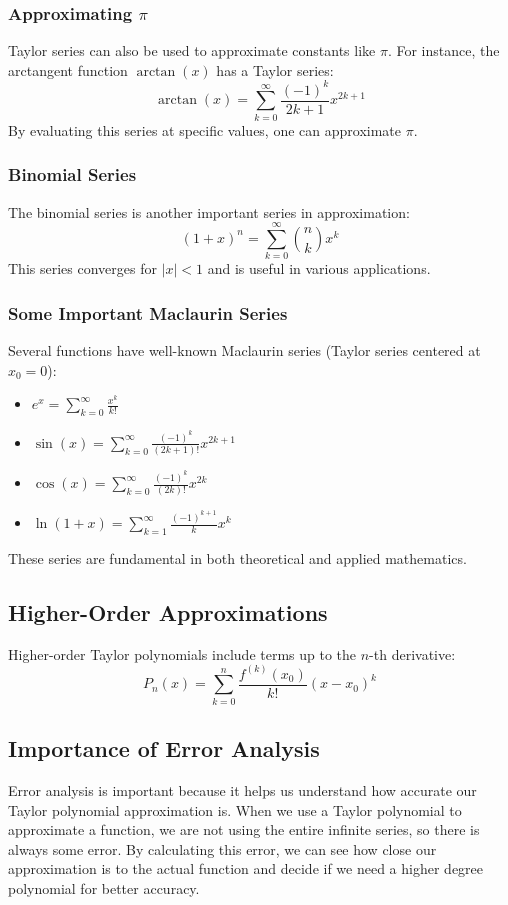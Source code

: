 \documentclass{article}
\begin{document}
\subsubsection*{Approximating \( \pi \)}
Taylor series can also be used to approximate constants like \( \pi \). For instance, the arctangent function \( \arctan(x) \) has a Taylor series:
\[ \arctan(x) = \sum_{k=0}^{\infty} \frac{(-1)^k}{2k+1} x^{2k+1} \]
By evaluating this series at specific values, one can approximate \( \pi \).

\subsubsection*{Binomial Series}
The binomial series is another important series in approximation:
\[ (1 + x)^n = \sum_{k=0}^{\infty} \binom{n}{k} x^k \]
This series converges for \( |x| < 1 \) and is useful in various applications.

\subsubsection*{Some Important Maclaurin Series}
Several functions have well-known Maclaurin series (Taylor series centered at \( x_0 = 0 \)):
\begin{itemize}
    \item \( e^x = \sum_{k=0}^{\infty} \frac{x^k}{k!} \)
    \item \( \sin(x) = \sum_{k=0}^{\infty} \frac{(-1)^k}{(2k+1)!} x^{2k+1} \)
    \item \( \cos(x) = \sum_{k=0}^{\infty} \frac{(-1)^k}{(2k)!} x^{2k} \)
    \item \( \ln(1+x) = \sum_{k=1}^{\infty} \frac{(-1)^{k+1}}{k} x^k \)
\end{itemize}
These series are fundamental in both theoretical and applied mathematics.
\subsection*{Higher-Order Approximations}
Higher-order Taylor polynomials include terms up to the \( n \)-th derivative:
\[ P_n(x) = \sum_{k=0}^{n} \frac{f^{(k)}(x_0)}{k!} (x - x_0)^k \]
\subsection*{Importance of Error Analysis}
Error analysis is important because it helps us understand how accurate our Taylor polynomial approximation is. When we use a Taylor polynomial to approximate a function, we are not using the entire infinite series, so there is always some error. By calculating this error, we can see how close our approximation is to the actual function and decide if we need a higher degree polynomial for better accuracy.
\end{document}
